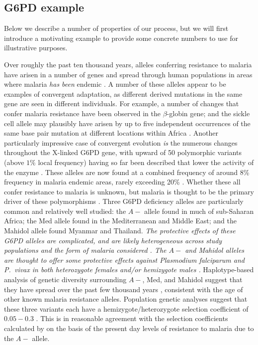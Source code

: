 \documentclass{article}
\newcommand{\mfp}[1]{{\it\color{red} #1} }
\begin{document}

\subsection{G6PD example}

Below we describe a number of properties of our process, but we will first introduce 
a motivating example to provide some concrete
numbers to use for illustrative purposes.

Over roughly the past ten thousand years, alleles conferring resistance to malaria have arisen in a number of genes 
and spread through human populations in areas where malaria \mfp{has been} endemic \citep{Kwiatkowski:05}. 
A number of these alleles appear to be examples of convergent adaptation, 
as different derived mutations in the same gene are seen in different individuals.
For example, 
a number of changes that confer malaria resistance have been observed in the $\beta$-globin gene;
and the sickle cell allele may plausibly have arisen by up to five independent occurrences
of the same base pair mutation at different locations within Africa
\citep{Flint:98,ralphcoop2010}.
Another particularly impressive case of convergent evolution \mfp{is} the numerous changes throughout the X-linked G6PD gene, 
with upward of 50 polymorphic variants (above $1\%$ local frequency) having so far been described 
that lower the activity of the enzyme \citep{Howes-g6pd-variants,Minucci-g6pd}. 
These alleles are now found at a combined frequency of around 8\% frequency in malaria endemic areas,
rarely exceeding 20\% \citep{Howes-g6pd-preval}. 
Whether these all confer resistance to malaria is unknown,
but malaria is thought to be the primary driver of these polymorphisms
\citep[see][ for a general review]{hedrick2011population}.
Three G6PD deficiency alleles are particularly common and relatively well studied: 
the $A-$ allele found in much of sub-Saharan Africa; 
the Med allele found in the Mediterranean and Middle East; 
and the Mahidol allele found Myanmar and Thailand.
\mfp{ 
The protective effects of these G6PD alleles are complicated, and are likely heterogeneous
across study populations and the form of malaria considered
\citep[see ][ for recent discussion]{manjurano_2015, malaria_network_2014}.  
The $A-$ and Mahidol alleles are thought to offer some protective effects against {\it Plasmodium falciparum} and {\it P.\ vivax} in both
heterozygote females and/or hemizygote males \citep{Ruwende-g6pd,
  Louicharoen-g6pd, manjurano_2015}. }
Haplotype-based analysis of genetic diversity surrounding
$A-$, Med, and Mahidol suggest that they have spread over the past 
few thousand years \citep{tishkoff-g6pd,Slatkin-age-est,Saunders-g6pd,Louicharoen-g6pd}, 
consistent with the age of other known malaria resistance alleles. 
Population genetic analyses suggest that these three variants each have a hemizygote/heterozygote 
selection coefficient of $0.05-0.3$
\citep{tishkoff-g6pd,Slatkin-age-est,Saunders-g6pd,Louicharoen-g6pd}. 
This is in reasonable agreement with the selection coefficients calculated by
\citet{Ruwende-g6pd} on the basis of the present day levels of
resistance to malaria due to the $A-$ allele. \\
\end{document}
